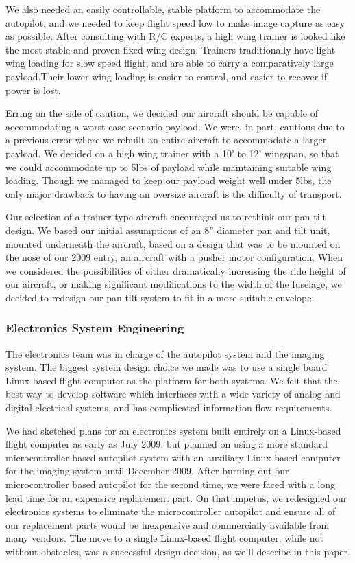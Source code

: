 \documentclass[10pt]{report}
\begin{document}
We also needed an easily controllable, stable platform to accommodate the autopilot, and we needed to keep flight speed low to make image capture as easy as possible. After consulting with R/C experts, a high wing trainer is looked like the most stable and proven fixed-wing design. Trainers traditionally have light wing loading for slow speed flight, and are able to carry a comparatively large payload.Their lower wing loading is easier to control, and easier to recover if power is lost. 

Erring on the side of caution, we decided our aircraft should be capable of accommodating a worst-case scenario payload. 
We were, in part, cautious due to a previous error where we rebuilt an entire aircraft to accommodate a larger payload.
We decided on a high wing trainer with a 10' to 12' wingspan, so that we could accommodate up to 5lbs of payload while maintaining suitable wing loading.
Though we managed to keep our payload weight well under 5lbs, the only major drawback to having an oversize aircraft is the difficulty of transport.

Our selection of a trainer type aircraft encouraged us to rethink our pan tilt design. We based our initial assumptions of an 8'' diameter pan and tilt unit, mounted underneath the aircraft, based on a design that was to be mounted on the nose of our 2009 entry, an aircraft with a pusher motor configuration. When we considered the possibilities of either dramatically increasing the ride height of our aircraft, or making significant modifications to the width of the fuselage, we decided to redesign our pan tilt system to fit in a more suitable envelope. 

\subsubsection{Electronics System Engineering}

The electronics team was in charge of the autopilot system and the imaging system. The biggest system design choice we made was to use a single board Linux-based flight computer as the platform for both systems. We felt that the best way to develop software which interfaces with a wide variety of analog and digital electrical systems, and has complicated information flow requirements.

We had sketched plans for an electronics system built entirely on a Linux-based flight computer as early as July 2009, but planned on using a more standard microcontroller-based autopilot system with an auxiliary Linux-based computer for the imaging system until December 2009. After burning out our microcontroller based autopilot for the second time, we were faced with a long lead time for an expensive replacement part. On that impetus, we redesigned our electronics systems to eliminate the microcontroller autopilot and ensure all of our replacement parts would be inexpensive and commercially available from many vendors. The move to a single Linux-based flight computer, while not without obstacles, was a successful design decision, as we'll describe in this paper.
\end{document}
